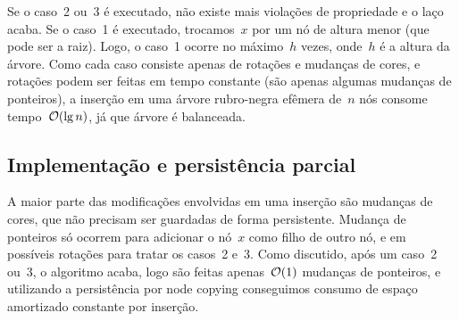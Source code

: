 \documentclass[main.tex]{subfiles}
\begin{document}
Se o caso~2 ou~3 é executado, não existe mais violações de propriedade e o laço acaba. Se o caso~1 é executado, trocamos~$x$ por um nó de altura menor (que pode ser a raiz). Logo, o caso~1 ocorre no máximo~$h$ vezes, onde~$h$ é a altura da árvore. Como cada caso consiste apenas de rotações e mudanças de cores, e rotações podem ser feitas em tempo constante (são apenas algumas mudanças de ponteiros), a inserção em uma árvore rubro-negra efêmera de~$n$ nós consome tempo~$\mathcal{O}(\lg n)$, já que árvore é balanceada.

\subsection{Implementação e persistência parcial}

A maior parte das modificações envolvidas em uma inserção são mudanças de cores, que não precisam ser guardadas de forma persistente. Mudança de ponteiros só ocorrem para adicionar o nó~$x$ como filho de outro nó, e em possíveis rotações para tratar os casos~2 e~3. Como discutido, após um caso~2 ou~3, o algoritmo acaba, logo são feitas apenas~$\mathcal{O}(1)$ mudanças de ponteiros, e utilizando a persistência por node copying conseguimos consumo de espaço amortizado constante por inserção.
\end{document}
